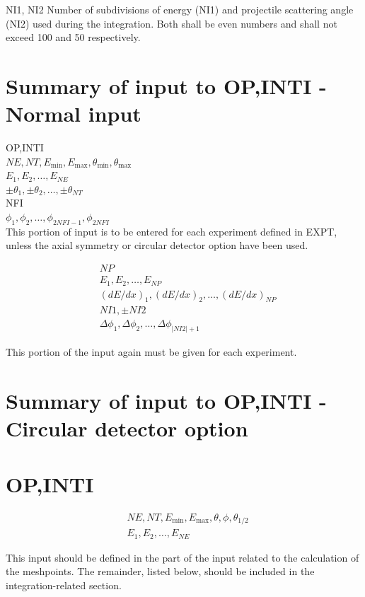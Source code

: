\documentclass[10pt]{article}
\begin{document}
NI1, NI2 Number of subdivisions of energy (NI1) and projectile scattering angle (NI2) used during the integration. Both shall be even numbers and shall not exceed 100 and 50 respectively.

\section*{Summary of input to OP,INTI - Normal input}
OP,INTI\\
$N E, N T, E_{\min }, E_{\max }, \theta_{\min }, \theta_{\max }$\\
$E_{1}, E_{2}, \ldots, E_{N E}$\\
$\pm \theta_{1}, \pm \theta_{2}, \ldots, \pm \theta_{N T}$\\
NFI\\
$\phi_{1}, \phi_{2}, \ldots, \phi_{2 N F I-1}, \phi_{2 N F I}$\\
This portion of input is to be entered for each experiment defined in EXPT, unless the axial symmetry or circular detector option have been used.

$$
\begin{aligned}
& N P \\
& E_{1}, E_{2}, \ldots, E_{N P} \\
& (d E / d x)_{1},(d E / d x)_{2}, \ldots,(d E / d x)_{N P} \\
& N I 1, \pm N I 2 \\
& \Delta \phi_{1}, \Delta \phi_{2}, \ldots, \Delta \phi_{|N I 2|+1}
\end{aligned}
$$

This portion of the input again must be given for each experiment.

\section*{Summary of input to OP,INTI - Circular detector option}
\section*{OP,INTI}
$$
\begin{aligned}
& N E, N T, E_{\min }, E_{\max }, \theta, \phi, \theta_{1 / 2} \\
& E_{1}, E_{2}, \ldots, E_{N E}
\end{aligned}
$$

This input should be defined in the part of the input related to the calculation of the meshpoints. The remainder, listed below, should be included in the integration-related section.
\end{document}
